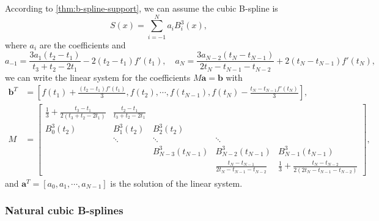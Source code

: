 \documentclass[a4paper]{article}
\theoremstyle{definition}
\begin{document}
According to \cref{thm:b-spline-support}, we can assume the cubic B-spline is 
\begin{equation}
  S(x) = \sum_{i = -1}^N a_i B_i^3(x),
  \label{eq:complete-cubic-b-spline}
\end{equation}
where $a_i$ are the coefficients and 
\begin{equation}
  a_{-1} = \frac{3a_1(t_2 - t_1)}{t_3 + t_2 - 2t_1} - 2(t_2 - t_1)f'(t_1),\quad a_N = \frac{3a_{N - 2}(t_N - t_{N - 1})}{2t_N - t_{N - 1} - t_{N - 2}} + 2(t_N - t_{N - 1})f'(t_N),
  \label{eq:complete-cubic-b-spline-coefficients}
\end{equation}
we can write the linear system for the coefficients $M\mathbf{a} = \mathbf{b}$ with
\begin{equation}
  \begin{aligned}
    \mathbf{b}^T &= [f(t_1) + \frac{(t_2 - t_1)f'(t_1)}{3}, f(t_2), \cdots, f(t_{N - 1}), f(t_N) - \frac{t_N - t_{N - 1}f'(t_N)}{3}], \\
    M &= \begin{bmatrix}
      \frac{1}{3} + \frac{t_3 - t_1}{2(t_3 + t_2 - 2t_1)} & \frac{t_2 - t_1}{t_3 + t_2 - 2t_1} &    &    &    \\
      B_0^3(t_2) & B_1^3(t_2) & B_2^3(t_2) &    &    \\
        & \ddots & \ddots & \ddots &    \\
        &    & B_{N - 3}^3(t_{N - 1}) & B_{N - 2}^3(t_{N - 1}) & B_{N - 1}^3(t_{N - 1}) \\
        &    &    & \frac{t_N - t_{N - 1}}{2t_N - t_{N - 1} - t_{N - 2}} & \frac{1}{3} + \frac{t_N - t_{N - 2}}{2(2t_N - t_{N - 1} - t_{N - 2})}
    \end{bmatrix},
  \end{aligned}
  \label{eq:complete-cubic-b-spline-linear-system}
\end{equation}
and $\mathbf{a}^T = [a_0, a_1, \cdots, a_{N - 1}]$ is the solution of the linear system.

\subsubsection{Natural cubic B-splines}
\label{sec:natural-cubic-b-splines}
\end{document}
